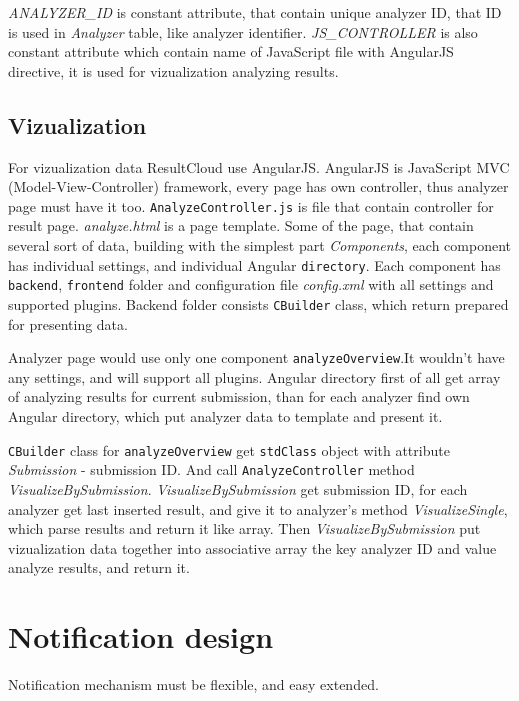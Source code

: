 \emph{ANALYZER\_ID} is constant attribute, that contain unique analyzer ID, that ID is used in \emph{Analyzer} table, like analyzer identifier. \emph{JS\_CONTROLLER} is also constant attribute which contain name of JavaScript file with AngularJS directive, it is used for vizualization analyzing results.

\section{Vizualization}

For vizualization data ResultCloud use AngularJS. AngularJS is JavaScript MVC (Model-View-Controller) framework, every page has own controller, thus analyzer page must have it too. \texttt{AnalyzeController.js} is file that contain controller for result page. \emph{analyze.html} is a page template. Some of the page, that contain several sort of data, building with the simplest part \emph{Components}, each component has individual settings, and individual Angular \texttt{directory}. Each component has \texttt{backend}, \texttt{frontend} folder and configuration file \emph{config.xml} with all settings and supported plugins. Backend folder consists \texttt{CBuilder} class, which return prepared for presenting data. 

Analyzer page would use only one component \texttt{analyzeOverview}.It wouldn't have any settings, and will support all plugins. Angular directory first of all get array of analyzing results for current submission, than for each analyzer find own Angular directory, which put analyzer data to template and present it. 

\texttt{CBuilder} class for \texttt{analyzeOverview} get \texttt{stdClass} object with attribute \emph{Submission} - submission ID. And call \texttt{AnalyzeController} method \emph{VisualizeBySubmission}. \emph{VisualizeBySubmission} get submission ID, for each analyzer get last inserted result, and give it to analyzer's method \emph{VisualizeSingle}, which parse results and return it like array. Then \emph{VisualizeBySubmission} put vizualization data together into associative array the key analyzer ID and value analyze results, and return it.

\chapter{Notification design}

Notification mechanism must be flexible, and easy extended. 

